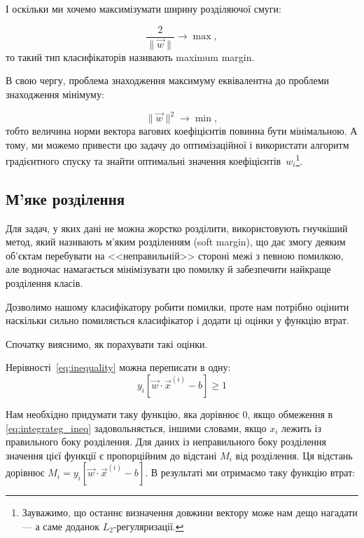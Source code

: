 \documentclass[]{article}
\begin{document}
І оскільки ми хочемо максимізумати ширину розділяючої смуги:

\begin{equation*}
    \dfrac2{\|\vec{w}\|} \to \max,
\end{equation*}
то такий тип класифікаторів називають maximum margin.

В свою чергу, проблема знаходження максимуму еквівалентна до проблеми знаходження мінімуму:

\begin{equation*}
   \|\vec{w}\|^2 \to \min,
\end{equation*}
тобто величина норми вектора вагових коефіцієнтів повинна бути мінімальною. А тому, ми можемо привести цю задачу до оптимізаційної і використати алгоритм градієнтного спуску та знайти оптимальні значення коефіцієнтів~$w_i$\footnote{Зауважимо, що останнє визначення довжини вектору може нам дещо нагадати --- а саме доданок $L_2$-регуляризації.}.



\subsection{М'яке розділення}

Для задач, у яких дані не можна жорстко розділити, використовують гнучкіший метод, який називають м'яким розділенням (soft margin), що дає змогу деяким об'єктам перебувати на <<неправильній>> стороні межі з певною помилкою, але водночас намагається мінімізувати цю помилку й забезпечити найкраще розділення класів.



Дозволимо нашому класифікатору робити помилки, проте нам потрібно оцінити наскільки сильно помиляється класифікатор і додати ці оцінки у функцію втрат.

Спочатку вияснимо, як порахувати такі оцінки.

Нерівності~\eqref{eq:inequality} можна переписати в одну:
\begin{equation}\label{eq:integrateg_ineq}
    y_i \left[ \vec{w}\cdot \vec{x}^{(i)} - b \right] \geqslant 1
\end{equation}

Нам необхідно придумати таку функцію, яка дорівнює $0$, якщо обмеження в \eqref{eq:integrateg_ineq} задовольняється, іншими словами, якщо $x_i$
лежить із правильного боку розділення. Для даних із неправильного боку розділення значення цієї функції є пропорційним до відстані $M_i$ від розділення. Ця відстань дорівнює  $M_i = y_i \left[ \vec{w}\cdot \vec{x}^{(i)} - b \right]$. В результаті ми отримаємо таку функцію втрат:
\end{document}
